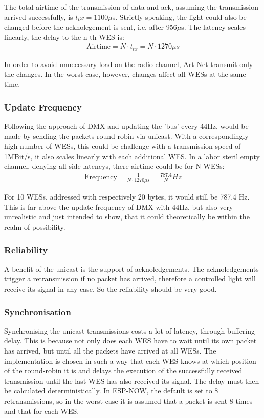 The total airtime of the transmission of data and ack, assuming the transmission arrived successfully, is $t_tx=1100\mu$s.
Strictly speaking, the light could also be changed before the acknolegement is sent, i.e. after 956$\mu$s.
The latency scales linearly, the delay to the n-th WES is:
\begin{align}
	\text{Airtime} = N \cdot t_{tx} = N \cdot 1270\mu s
\end{align}

In order to avoid unnecessary load on the radio channel, Art-Net transmit only the changes.
In the worst case, however, changes affect all WESs at the same time.

\subsubsection*{Update Frequency}
Following the approach of DMX and updating the 'bus' every 44Hz, would be made by sending the packets round-robin via unicast. 
With a correspondingly high number of WESs, this could be challenge with a transmission speed of 1MBit/s, 
it also scales linearly with each additional WES. 
In a labor steril empty channel, denying all side latencys, there airtime could be for N WESs:
\begin{align}
	\text{Frequency} = \frac{1}{N \cdot 1270\mu s} = \frac{787.4}{N} Hz
\end{align}

For 10 WESs, addressed with respectively 20 bytes, it would still be 787.4 Hz.
This is far above the update frequency of DMX with 44Hz, but also very unrealistic and just intended to show,
that it could theoretically be within the realm of possibility.

\subsubsection*{Reliability}

A benefit of the unicast is the support of acknoledgements. 
The acknoledgements trigger a retransmission if no packet has arrived, therefore a controlled light will receive its signal in any case.
So the reliability should be very good.

\subsubsection*{Synchronisation}

Synchronising the unicast transmissions costs a lot of 
latency, through buffering delay.
This is because not only does each WES have to wait until its own packet has arrived,
but until all the packets have arrived at all WESs.
The implementation is chosen in such a way that each WES knows at which position of the round-robin it is
and delays the execution of the successfully received transmission until the last WES has also received its signal.
The delay must then be calculated deterministically.
In ESP-NOW, the default is set to 8 retransmissions, so in the worst case it is assumed that a packet is sent 8 times
and that for each WES.

